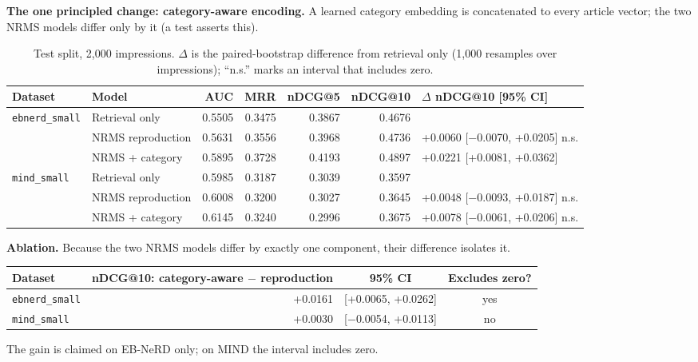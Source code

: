 \documentclass[11pt,a4paper]{article}
\begin{document}
\textbf{The one principled change: category-aware encoding.} A learned category embedding is concatenated to every article vector; the two NRMS models differ only by it (a test asserts this).

\begin{table}[H]
\centering\footnotesize\setlength{\tabcolsep}{4pt}
\begin{tabular}{llrrrrl}
\toprule
\textbf{Dataset} & \textbf{Model} & \textbf{AUC} & \textbf{MRR} & \textbf{nDCG@5} & \textbf{nDCG@10} & \textbf{$\Delta$ nDCG@10 [95\% CI]} \\
\midrule
\texttt{ebnerd\_small} & Retrieval only & 0.5505 & 0.3475 & 0.3867 & 0.4676 &  \\
 & NRMS reproduction & 0.5631 & 0.3556 & 0.3968 & 0.4736 & +0.0060 [$-$0.0070, +0.0205] n.s. \\
 & NRMS + category & 0.5895 & 0.3728 & 0.4193 & 0.4897 & +0.0221 [+0.0081, +0.0362] \\
\midrule
\texttt{mind\_small} & Retrieval only & 0.5985 & 0.3187 & 0.3039 & 0.3597 &  \\
 & NRMS reproduction & 0.6008 & 0.3200 & 0.3027 & 0.3645 & +0.0048 [$-$0.0093, +0.0187] n.s. \\
 & NRMS + category & 0.6145 & 0.3240 & 0.2996 & 0.3675 & +0.0078 [$-$0.0061, +0.0206] n.s. \\
\bottomrule
\end{tabular}
\caption{Test split, 2{,}000 impressions. $\Delta$ is the paired-bootstrap difference from retrieval only (1{,}000 resamples over impressions); ``n.s.'' marks an interval that includes zero.}
\end{table}

\textbf{Ablation.} Because the two NRMS models differ by exactly one component,
their difference isolates it.

\begin{table}[H]
\centering\small
\begin{tabular}{lrcc}
\toprule
\textbf{Dataset} & \textbf{nDCG@10: category-aware $-$ reproduction} & \textbf{95\% CI} & \textbf{Excludes zero?} \\
\midrule
\texttt{ebnerd\_small} & +0.0161 & [+0.0065, +0.0262] & yes \\
\texttt{mind\_small} & +0.0030 & [$-$0.0054, +0.0113] & no \\
\bottomrule
\end{tabular}
\end{table}

The gain is claimed on EB-NeRD only; on MIND the interval includes zero.
\end{document}
